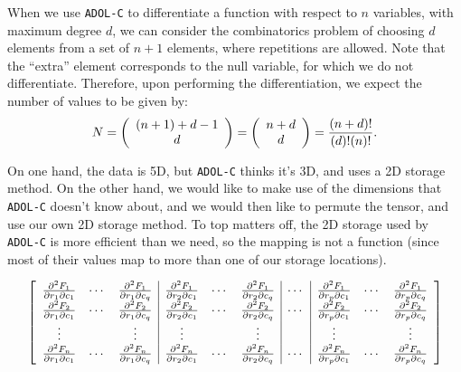 


\usepackage{tikz}


\pagestyle{main}

\usetikzlibrary{decorations.pathreplacing,angles,quotes}




When we use \texttt{ADOL-C} to differentiate a function with respect to $n$ variables, with maximum degree $d$, we can consider the combinatorics problem of choosing $d$ elements from a set of $n+1$ elements, where repetitions are allowed.
Note that the ``extra'' element corresponds to the null variable, for which we do not differentiate.
Therefore, upon performing the differentiation, we expect the number of values to be given by:
\[
N = \bigg( \begin{array}{c} (n+1)+d-1 \\ d \end{array} \bigg) = 
    \bigg( \begin{array}{c} n+d \\ d \end{array} \bigg) = 
    \frac{(n+d)!}{(d)!(n)!}.
\]

On one hand, the data is 5D, but \texttt{ADOL-C} thinks it's 3D, and uses a 2D storage method.
On the other hand, we would like to make use of the dimensions that \texttt{ADOL-C} doesn't know about, and we would then like to permute the tensor, and use our own 2D storage method.
To top matters off, the 2D storage used by \texttt{ADOL-C} is more efficient than we need, so the mapping is not a function (since most of their values map to more than one of our storage locations). 

\[
\left[
\begin{array}{ccc|ccc|c|ccc}
\pdv{F_{1}}{r_{1}}{c_{1}} & \cdots & \pdv{F_{1}}{r_{1}}{c_{q}} &
\pdv{F_{1}}{r_{2}}{c_{1}} & \cdots & \pdv{F_{1}}{r_{2}}{c_{q}} & \cdots & 
\pdv{F_{1}}{r_{p}}{c_{1}} & \cdots & \pdv{F_{1}}{r_{p}}{c_{q}} \\
%
\pdv{F_{2}}{r_{1}}{c_{1}} & \cdots & \pdv{F_{2}}{r_{1}}{c_{q}} &
\pdv{F_{2}}{r_{2}}{c_{1}} & \cdots & \pdv{F_{2}}{r_{2}}{c_{q}} & \cdots & 
\pdv{F_{2}}{r_{p}}{c_{1}} & \cdots & \pdv{F_{2}}{r_{p}}{c_{q}} \\
%
\vdots & & \vdots & \vdots & & \vdots & & \vdots & & \vdots \\
%
\pdv{F_{n}}{r_{1}}{c_{1}} & \cdots & \pdv{F_{n}}{r_{1}}{c_{q}} &
\pdv{F_{n}}{r_{2}}{c_{1}} & \cdots & \pdv{F_{n}}{r_{2}}{c_{q}} & \cdots & 
\pdv{F_{n}}{r_{p}}{c_{1}} & \cdots & \pdv{F_{n}}{r_{p}}{c_{q}}
\end{array}
\right]
\]


